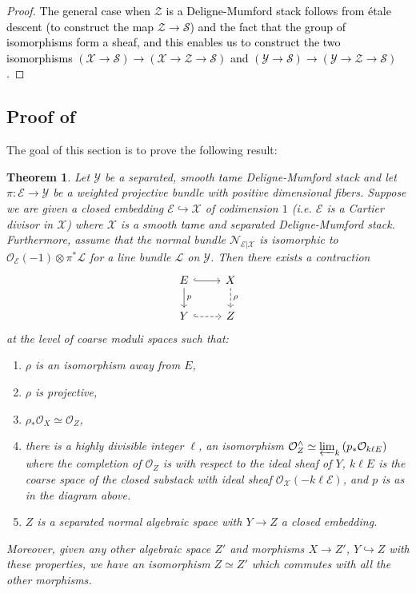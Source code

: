 \documentclass{amsart}
\newcommand{\cE}{\mathcal{E}}
\newcommand{\cL}{\mathcal{L}}
\newcommand{\cN}{\mathcal{N}}
\newcommand{\cO}{\mathcal{O}}
\newcommand{\cS}{\mathcal{S}}
\newcommand{\cX}{\mathcal{X}}
\newcommand{\cY}{\mathcal{Y}}
\newcommand{\cZ}{\mathcal{Z}}
\newtheorem{Teo}[theorem]{Theorem}
\theoremstyle{definition}
\begin{document}
\begin{proof}
\textcolor{black}{The general case when $\cZ$ is a Deligne-Mumford stack follows from \'etale descent (to construct the map $\cZ\to \cS$) and the fact that the group of isomorphisms form a sheaf, and this enables us to construct the two isomorphisms $(\cX\to \cS)\to (\cX\to \cZ\to \cS)$ and $(\cY\to \cS)\to (\cY\to \cZ\to \cS)$.}
\end{proof}
    

\subsection{Proof of }
The goal of this section is to prove the following result:
\begin{Teo}\label{teo_contraction_cms}
    Let $\cY$ be a separated, smooth \textcolor{black}{tame} Deligne-Mumford stack and let $\pi:\cE \rightarrow \cY$ be a weighted projective bundle with positive dimensional fibers. Suppose we are given a closed embedding $\cE \hookrightarrow \cX$ of codimension $1$ (i.e. $\cE$ is a Cartier divisor in $\cX$) where $\cX$ is a smooth \textcolor{black}{tame} and separated Deligne-Mumford stack. Furthermore, assume that the normal bundle $\cN_{\cE\vert\cX}$ is isomorphic to $\cO_{\cE}(-1)\otimes \pi^*\cL$ for a line bundle $\cL$ on $\cY$. Then there exists a contraction
    $$ 
    \begin{tikzcd}
    E \arrow[d, "p"] \arrow[r, hook] & X \arrow[d, dashed, "\rho"] \\
    Y \arrow[r, dashed, hook]   & Z                  
    \end{tikzcd}
    $$
    at the level of coarse moduli spaces such that:
    \begin{enumerate}
        \item $\rho$ is an isomorphism away from $E$,
        \item $\rho$ is projective,
        \item $\rho_*\cO_X \simeq \cO_Z$,
        \item there is a highly divisible integer $\ell$, an isomorphism $\cO_Z^{\wedge} \simeq  \varprojlim_k\left(p_*\cO_{k\ell E} \right)$ where the completion of $\cO_Z$ is with respect to the ideal sheaf of $Y$,
             $k\ell E$ is the coarse space of the closed substack with ideal sheaf $\cO_{\cX}(-k \ell \cE)$, and
             $p$ is as in the diagram above.
        \item $Z$ is a separated normal algebraic space with $Y\to Z$ a closed embedding.        
    \end{enumerate} Moreover, given any other algebraic space $Z'$ and morphisms $X\to Z'$, $Y\hookrightarrow Z$ with these properties, we have an isomorphism $Z\simeq Z'$ which commutes with all the other morphisms.
\end{Teo}
\end{document}
